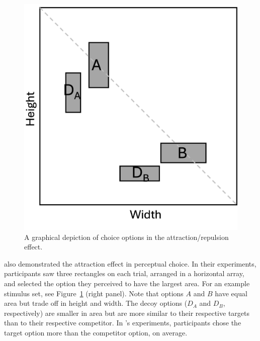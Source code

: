 \begin{figure}
   \centering
   \includegraphics[width=\linewidth]{figures/percep.jpg}
   \caption{A graphical depiction of choice options in the attraction/repulsion effect.}
   \label{fig:fig_opts}
\end{figure}

\textcite{trueblood2013not} also demonstrated the attraction effect in perceptual choice. In their experiments, participants saw three rectangles on each trial, arranged in a horizontal array, and selected the option they perceived to have the largest area. For an example stimulus set, see Figure~\ref{fig:fig_opts} (right panel). Note that options $A$ and $B$ have equal area but trade off in height and width. The decoy options ($D_{A}$ and $D_{B}$, respectively) are smaller in area but are more similar to their respective targets than to their respective competitor. In \textcite{trueblood2013not}'s experiments, participants chose the target option more than the competitor option, on average. 

